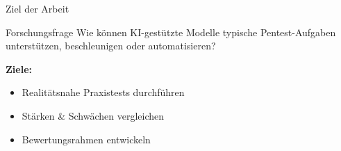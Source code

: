\documentclass[
	aspectratio=169,	%
	onlytextwidth,		%
	t,					%
	]{beamer}
\begin{document}
\begin{frame}{Ziel der Arbeit}	
	\begin{block}{Forschungsfrage}
		Wie können KI-gestützte Modelle typische Pentest-Aufgaben 
		unterstützen, beschleunigen oder automatisieren?
	\end{block}
	
	\vspace{0.5cm}
	\textbf{Ziele:}
	\begin{itemize}
		\item Realitätsnahe Praxistests durchführen
		\item Stärken \& Schwächen vergleichen
		\item Bewertungsrahmen entwickeln
	\end{itemize}
\end{frame}
%
%
%		
%
%
%
%
%		
%		
%	
\end{document}
